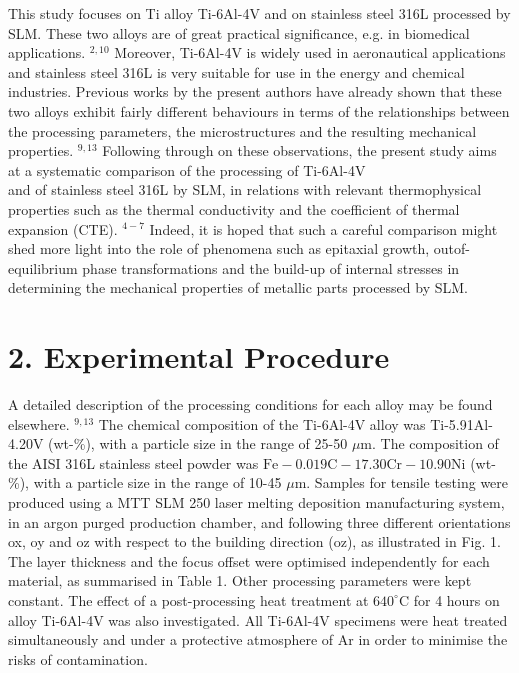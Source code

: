 \documentclass[10pt]{article}
\begin{document}
This study focuses on Ti alloy Ti-6Al-4V and on stainless steel 316L processed by SLM. These two alloys are of great practical significance, e.g. in biomedical applications. ${ }^{2,10}$ Moreover, Ti-6Al-4V is widely used in aeronautical applications and stainless steel 316L is very suitable for use in the energy and chemical industries. Previous works by the present authors have already shown that these two alloys exhibit fairly different behaviours in terms of the relationships between the processing parameters, the microstructures and the resulting mechanical properties. ${ }^{9,13}$ Following through on these observations, the present study aims at a systematic comparison of the processing of Ti-6Al-4V\\
and of stainless steel 316L by SLM, in relations with relevant thermophysical properties such as the thermal conductivity and the coefficient of thermal expansion (CTE). ${ }^{4-7}$ Indeed, it is hoped that such a careful comparison might shed more light into the role of phenomena such as epitaxial growth, outof-equilibrium phase transformations and the build-up of internal stresses in determining the mechanical properties of metallic parts processed by SLM.

\section*{2. Experimental Procedure}
A detailed description of the processing conditions for each alloy may be found elsewhere. ${ }^{9,13}$ The chemical composition of the Ti-6Al-4V alloy was Ti-5.91Al-4.20V (wt-\%), with a particle size in the range of 25-50 $\mu \mathrm{m}$. The composition of the AISI 316L stainless steel powder was $\mathrm{Fe}-0.019 \mathrm{C}-17.30 \mathrm{Cr}-10.90 \mathrm{Ni}$ (wt-\%), with a particle size in the range of 10-45 $\mu \mathrm{m}$. Samples for tensile testing were produced using a MTT SLM 250 laser melting deposition manufacturing system, in an argon purged production chamber, and following three different orientations ox, oy and oz with respect to the building direction (oz), as illustrated in Fig. 1. The layer thickness and the focus offset were optimised independently for each material, as summarised in Table 1. Other processing parameters were kept constant. The effect of a post-processing heat treatment at $640^{\circ} \mathrm{C}$ for 4 hours on alloy Ti-6Al-4V was also investigated. All Ti-6Al-4V specimens were heat treated simultaneously and under a protective atmosphere of Ar in order to minimise the risks of contamination.
\end{document}
